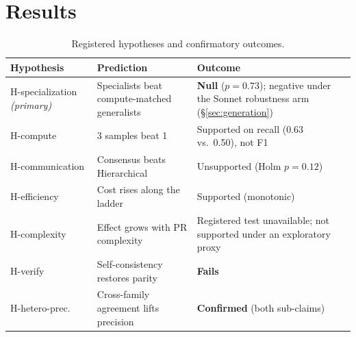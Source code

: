 \documentclass[conference]{IEEEtran}
\begin{document}
\section{Results}
\label{sec:results}

\begin{table}[t]
\caption{Registered hypotheses and confirmatory outcomes.}
\label{tab:hyp}
\centering
\footnotesize
\begin{tabular}{@{}p{1.55cm}p{2.6cm}p{3.0cm}@{}}
\toprule
\textbf{Hypothesis} & \textbf{Prediction} & \textbf{Outcome} \\
\midrule
H-specialization \emph{(primary)} & Specialists beat compute-matched generalists & \textbf{Null} ($p{=}0.73$); negative under the Sonnet robustness arm (\S\ref{sec:generation}) \\
H-compute        & 3 samples beat 1 & Supported on recall (0.63 vs.\ 0.50), not F1 \\
H-communication  & Consensus beats Hierarchical & Unsupported (Holm $p{=}0.12$) \\
H-efficiency     & Cost rises along the ladder & Supported (monotonic) \\
H-complexity     & Effect grows with PR complexity & Registered test unavailable; not supported under an exploratory proxy \\
H-verify         & Self-consistency restores parity & \textbf{Fails} \\
H-hetero-prec.\  & Cross-family agreement lifts precision & \textbf{Confirmed} (both sub-claims) \\
\bottomrule
\end{tabular}
\end{table}
\end{document}
